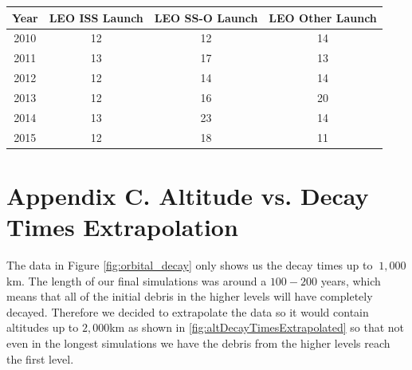 \documentclass{article}
\theoremstyle{definition}
\begin{document}
\begin{enumerat}
\begin{table}
\end{table}
\begin{table}
\centering
    \begin{tabular}{| c | c | c | c |}   
    \hline
    \textbf{Year} & \textbf{LEO ISS Launch} & \textbf{LEO SS-O Launch}  & \textbf{LEO Other Launch} \\ \hline
    2010 & 12 & 12 & 14\\ \hline
    2011 & 13 & 17 & 13\\ \hline
    2012 & 12 & 14 & 14\\ \hline
    2013 & 12 & 16 & 20\\ \hline
    2014 & 13 & 23 & 14\\ \hline
    2015 & 12 & 18 & 11\\ \hline
    \end{tabular}
\end{table}

\section*{Appendix C. Altitude vs. Decay Times Extrapolation}
The data in Figure \ref{fig:orbital_decay} only shows us the decay times up to $~1,000$km. The length of our final simulations was around a $100-200$ years, which means that all of the initial debris in the higher levels will have completely decayed. Therefore we decided to extrapolate the data so it would contain altitudes up to $2,000$km as shown in \ref{fig:altDecayTimesExtrapolated} so that not even in the longest simulations we have the debris from the higher levels reach the first level.


\end{enumerat}
\end{document}
